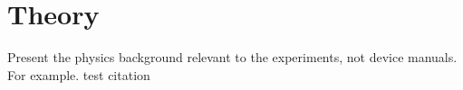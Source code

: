 
\section{Theory}
Present the physics background relevant to the experiments, not device manuals.
For example.
test citation 
\cite[20]{ftb}